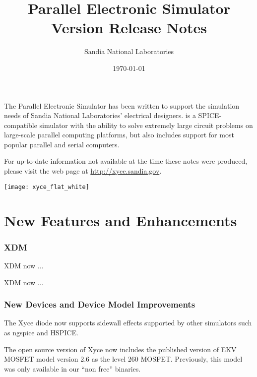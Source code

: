 \documentclass[letterpaper]{scrartcl}
\title{\XyceTitle{} Parallel Electronic Simulator\\
Version \XyceVersionVar{} Release Notes}
\author{ Sandia National Laboratories}
\date{\today}
\begin{document}
\maketitle

The \XyceTM{} Parallel Electronic Simulator has been written to support the
simulation needs of Sandia National Laboratories' electrical designers.
\XyceTM{} is a SPICE-compatible simulator with the ability to solve extremely
large circuit problems on large-scale parallel computing platforms, but also
includes support for most popular parallel and serial computers.

For up-to-date information not available at the time these notes were produced,
please visit the \XyceTM{} web page at
{\color{XyceDeepRed}\url{http://xyce.sandia.gov}}.

\tableofcontents
\vspace*{\fill}
\parbox{\textwidth}
{
  \hfill
  \texttt{[image: xyce\_flat\_white]}
}


\newpage
\section{New Features and Enhancements}

\subsubsection*{XDM}
\begin{XyceItemize}

\item XDM now ... 

\item XDM now ...



\end{XyceItemize}

\subsubsection*{New Devices and Device Model Improvements}
\begin{XyceItemize}
\item The Xyce diode now supports sidewall effects supported by other
  simulators such as ngspice and HSPICE.
\item The open source version of Xyce now includes the published
  version of EKV MOSFET model version 2.6 as the level 260 MOSFET.
  Previously, this model was only available in our ``non free''
  binaries.
\end{XyceItemize}
\end{document}
